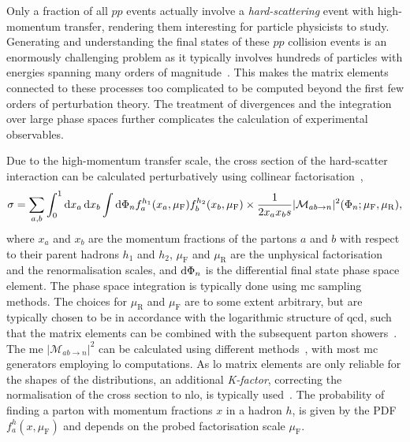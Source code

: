 
Only a fraction of all $pp$ events actually involve a \textit{hard-scattering} event with high-momentum transfer, rendering them interesting for particle physicists to study. Generating and understanding the final states of these $pp$ collision events is an enormously challenging problem as it typically involves hundreds of particles with energies spanning many orders of magnitude~\cite{Buckley:2011ms}. This makes the matrix elements connected to these processes too complicated to be computed beyond the first few orders of perturbation theory. The treatment of divergences and the integration over large phase spaces further complicates the calculation of experimental observables.

Due to the high-momentum transfer scale, the cross section of the hard-scatter interaction can be calculated perturbatively using collinear factorisation~\cite{Buckley:2011ms},
\begin{equation}
	\sigma = \sum_{a,b}{\int_0^1{\mathop{}\!\mathrm{d} x_a \mathop{}\!\mathrm{d} x_b\int{\mathop{}\!\mathrm{d}\Phi_n f_a^{h_1}(x_a,\mu_\mathrm{F}) f_b^{h_2}(x_b,\mu_\mathrm{F})} \times \frac{1}{2 x_a x_b s}\vert \mathcal{M}_{ab\rightarrow n} \vert^2 (\Phi_n; \mu_\mathrm{F},\mu_\mathrm{R})}},
\end{equation}
where $x_a$ and $x_b$ are the momentum fractions of the partons $a$ and $b$ with respect to their parent hadrons $h_1$ and $h_2$, $\mu_\mathrm{F}$ and $\mu_\mathrm{R}$ are the unphysical factorisation and the renormalisation scales, and $\mathop{}\!\mathrm{d}\Phi_n$ is the differential final state phase space element.
The phase space integration is typically done using \gls{mc} sampling methods.
The choices for $\mu_\mathrm{R}$ and $\mu_\mathrm{F}$ are to some extent arbitrary, but are typically chosen to be in accordance with the logarithmic structure of \gls{qcd}, such that the matrix elements can be combined with the subsequent parton showers~\cite{Buckley:2011ms}.
The \gls{me} $\vert\mathcal{M}_{ab\rightarrow n}\vert^2$ can be calculated using different methods~\cite{Buckley:2011ms}, with most \gls{mc} generators employing \gls{lo} computations.
As \gls{lo} matrix elements are only reliable for the shapes of the distributions, an additional \textit{K-factor}, correcting the normalisation of the cross section to \gls{nlo}, is typically used~\cite{Buckley:2011ms}.
The probability of finding a parton with momentum fractions $x$ in a hadron $h$, is given by the \gls{PDF} $f_a^{h}(x,\mu_\mathrm{F})$ and depends on the probed factorisation scale $\mu_\mathrm{F}$.
